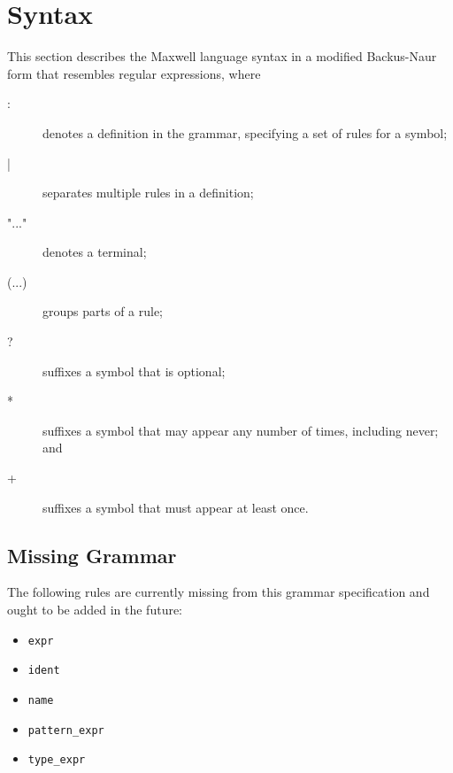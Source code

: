 \chapter{Syntax}

This section describes the Maxwell language syntax in a modified Backus-Naur
form that resembles regular expressions, where

\begin{description}
	\item[:] denotes a definition in the grammar, specifying a set of
	      rules for a symbol;
	\item[|] separates multiple rules in a definition;
	\item["..."] denotes a terminal;
	\item[(...)] groups parts of a rule;
	\item[?] suffixes a symbol that is optional;
	\item[*] suffixes a symbol that may appear any number of times,
	      including never; and
	\item[+] suffixes a symbol that must appear at least once.
\end{description}

\newenvironment{exdesc}{\begin{inparaenum}[\bfseries (a)]}{\end{inparaenum}}










\section{Missing Grammar}

The following rules are currently missing from this grammar specification and
ought to be added in the future:

\begin{itemize}
\item \verb|expr|
\item \verb|ident|
\item \verb|name|
\item \verb|pattern_expr|
\item \verb|type_expr|
\end{itemize}
